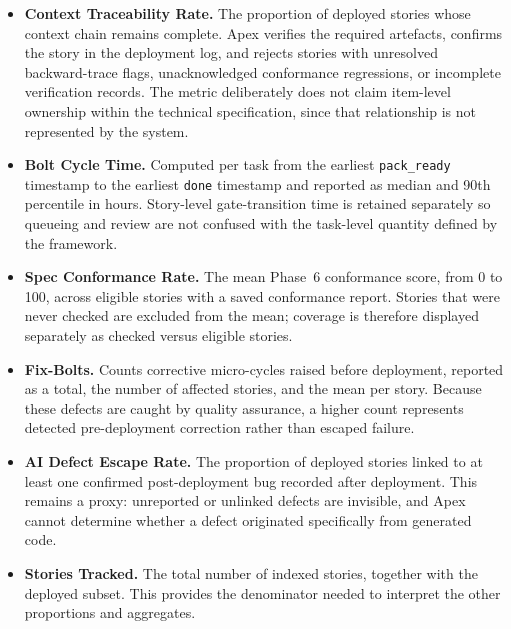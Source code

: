 \begin{itemize}[leftmargin=0.6cm, itemsep=0.45em]

\item \textbf{Context Traceability Rate.} The proportion of deployed stories whose context chain remains complete. Apex verifies the required artefacts, confirms the story in the deployment log, and rejects stories with unresolved backward-trace flags, unacknowledged conformance regressions, or incomplete verification records. The metric deliberately does not claim item-level ownership within the technical specification, since that relationship is not represented by the system.

\item \textbf{Bolt Cycle Time.} Computed per task from the earliest \texttt{pack\_ready} timestamp to the earliest \texttt{done} timestamp and reported as median and 90th percentile in hours. Story-level gate-transition time is retained separately so queueing and review are not confused with the task-level quantity defined by the framework.

\item \textbf{Spec Conformance Rate.} The mean Phase~6 conformance score, from 0 to 100, across eligible stories with a saved conformance report. Stories that were never checked are excluded from the mean; coverage is therefore displayed separately as checked versus eligible stories.

\item \textbf{Fix-Bolts.} Counts corrective micro-cycles raised before deployment, reported as a total, the number of affected stories, and the mean per story. Because these defects are caught by quality assurance, a higher count represents detected pre-deployment correction rather than escaped failure.

\item \textbf{AI Defect Escape Rate.} The proportion of deployed stories linked to at least one confirmed post-deployment bug recorded after deployment. This remains a proxy: unreported or unlinked defects are invisible, and Apex cannot determine whether a defect originated specifically from generated code.

\item \textbf{Stories Tracked.} The total number of indexed stories, together with the deployed subset. This provides the denominator needed to interpret the other proportions and aggregates.

\end{itemize}

